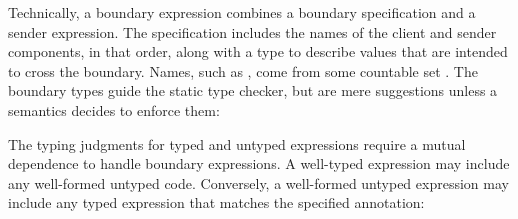 \documentclass[ twoside,open=right,titlepage,numbers=noenddot,headinclude,%
                footinclude=true,cleardoublepage=empty,abstract=off,
                BCOR=5mm,paper=a4,fontsize=11pt,%
                ngerman,american,%
                parts,pdfspacing]{scrreprt}
\begin{document}
Technically, a boundary expression combines a boundary specification \relax{$\sbnd$}
 and a sender expression.
The specification includes the names of the client and sender components,
 in that order, along with a type to describe values that are intended to cross
 the boundary.
Names, such as , come from some countable set \relax{$\sowner$}.
The boundary types guide the static type checker, but are mere suggestions
 unless a semantics decides to enforce them:


The typing judgments for typed and untyped expressions require a mutual
 dependence to handle boundary expressions.
A well{-}typed expression may include any well{-}formed untyped code.
Conversely, a well{-}formed untyped expression may include any typed expression
 that matches the specified annotation:

\end{document}
